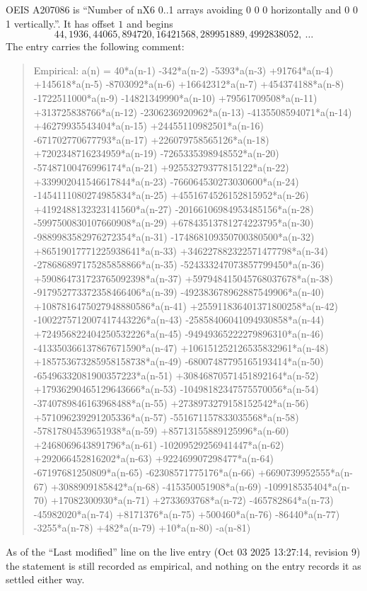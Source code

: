 \documentclass[11pt,a4paper]{article}
\theoremstyle{plain}
\theoremstyle{definition}
\begin{document}
OEIS A207086 is ``Number of nX6 0..1 arrays avoiding 0 0 0 horizontally and 0 0 1 vertically.''. It has offset
$1$ and begins
\[
44, 1936, 44065, 894720, 16421568, 289951889, 4992838052,\ \dots
\]
The entry carries the following comment:
\begin{quote}\small
Empirical: a(n) = 40*a(n-1) -342*a(n-2) -5393*a(n-3) +91764*a(n-4) +145618*a(n-5) -8703092*a(n-6) +16642312*a(n-7) +454374188*a(n-8) -1722511000*a(n-9) -14821349990*a(n-10) +79561709508*a(n-11) +313725838766*a(n-12) -2306236920962*a(n-13) -4135508594071*a(n-14) +46279935543404*a(n-15) +24455110982501*a(n-16) -671702770677793*a(n-17) +226079758565126*a(n-18) +7202348716234959*a(n-19) -7265335398948552*a(n-20) -57487100476996174*a(n-21) +92553279377815122*a(n-22) +339902041546617844*a(n-23) -766064530273030600*a(n-24) -1454111080274985834*a(n-25) +4551674526152815952*a(n-26) +4192488132323141560*a(n-27) -20166106984953485156*a(n-28) -5997500830107660908*a(n-29) +67843513781274223795*a(n-30) -9889983582976272354*a(n-31) -174868109350700380500*a(n-32) +86519017771225938641*a(n-33) +346227882322571477798*a(n-34) -278686897175285858866*a(n-35) -524333247073857799450*a(n-36) +590864731723765092398*a(n-37) +597948415045768037678*a(n-38) -917952773372358466406*a(n-39) -492383678962887549906*a(n-40) +1087816475027948880586*a(n-41) +255911836401371800258*a(n-42) -1002275712007417443226*a(n-43) -25858406041094930858*a(n-44) +724956822404250532226*a(n-45) -94949365222279896310*a(n-46) -413350366137867671590*a(n-47) +106151252126535832961*a(n-48) +185753673285958158738*a(n-49) -68007487795165193414*a(n-50) -65496332081900357223*a(n-51) +30846870571451892164*a(n-52) +17936290465129643666*a(n-53) -10498182347575570056*a(n-54) -3740789846163968488*a(n-55) +2738973279158152542*a(n-56) +571096239291205336*a(n-57) -551671157833035568*a(n-58) -57817804539651938*a(n-59) +85713155889125996*a(n-60) +2468069643891796*a(n-61) -10209529256941447*a(n-62) +292066452816202*a(n-63) +922469907298477*a(n-64) -67197681250809*a(n-65) -62308571775176*a(n-66) +6690739952555*a(n-67) +3088909185842*a(n-68) -415350051908*a(n-69) -109918535404*a(n-70) +17082300930*a(n-71) +2733693768*a(n-72) -465782864*a(n-73) -45982020*a(n-74) +8171376*a(n-75) +500460*a(n-76) -86440*a(n-77) -3255*a(n-78) +482*a(n-79) +10*a(n-80) -a(n-81)
\end{quote}
As of the ``Last modified'' line on the live entry (Oct 03 2025 13:27:14, revision
9) the statement is still recorded as empirical, and nothing on the entry
records it as settled either way.
\end{document}
